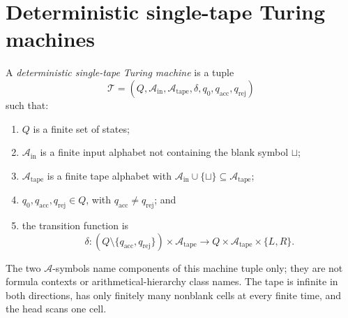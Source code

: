 \section{Deterministic single-tape Turing machines}
\label{sec:turing-machines-01}

\begin{definition}
A \emph{deterministic single-tape Turing machine} is a tuple
\[
  \mathcal T=(Q,\mathcal A_{\mathrm{in}},\mathcal A_{\mathrm{tape}},
  \delta,q_0,q_{\mathrm{acc}},q_{\mathrm{rej}})
\]
such that:
\begin{enumerate}
  \item \(Q\) is a finite set of states;
  \item \(\mathcal A_{\mathrm{in}}\) is a finite input alphabet not containing
        the blank symbol \(\sqcup\);
  \item \(\mathcal A_{\mathrm{tape}}\) is a finite tape alphabet with
        \(\mathcal A_{\mathrm{in}}\cup\{\sqcup\}
        \subseteq\mathcal A_{\mathrm{tape}}\);
  \item \(q_0,q_{\mathrm{acc}},q_{\mathrm{rej}}\in Q\), with
        \(q_{\mathrm{acc}}\neq q_{\mathrm{rej}}\); and
  \item the transition function is
  \[
    \delta:(Q\setminus\{q_{\mathrm{acc}},q_{\mathrm{rej}}\})
    \times\mathcal A_{\mathrm{tape}}
    \longrightarrow Q\times\mathcal A_{\mathrm{tape}}\times\{L,R\}.
  \]
\end{enumerate}
The two \(\mathcal A\)-symbols name components of this machine tuple only;
they are not formula contexts or arithmetical-hierarchy class names.
The tape is infinite in both directions, has only finitely many nonblank cells
at every finite time, and the head scans one cell.
\end{definition}

